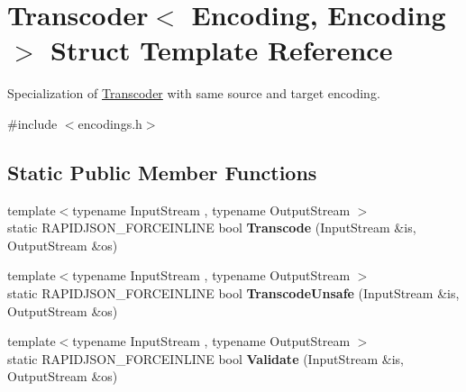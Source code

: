 \hypertarget{struct_transcoder_3_01_encoding_00_01_encoding_01_4}{}\section{Transcoder$<$ Encoding, Encoding $>$ Struct Template Reference}
\label{struct_transcoder_3_01_encoding_00_01_encoding_01_4}


Specialization of \hyperlink{struct_transcoder}{Transcoder} with same source and target encoding.  




{\ttfamily \#include $<$encodings.\+h$>$}

\subsection*{Static Public Member Functions}
\begin{DoxyCompactItemize}
\item 
\mbox{\label{struct_transcoder_3_01_encoding_00_01_encoding_01_4_aad11cdc2b829123a7b9969e34d456813}} 
{\footnotesize template$<$typename Input\+Stream , typename Output\+Stream $>$ }\\static R\+A\+P\+I\+D\+J\+S\+O\+N\+\_\+\+F\+O\+R\+C\+E\+I\+N\+L\+I\+NE bool {\bfseries Transcode} (Input\+Stream \&is, Output\+Stream \&os)
\item 
\mbox{\label{struct_transcoder_3_01_encoding_00_01_encoding_01_4_addf67decfff7d0de510c47842eb53cef}} 
{\footnotesize template$<$typename Input\+Stream , typename Output\+Stream $>$ }\\static R\+A\+P\+I\+D\+J\+S\+O\+N\+\_\+\+F\+O\+R\+C\+E\+I\+N\+L\+I\+NE bool {\bfseries Transcode\+Unsafe} (Input\+Stream \&is, Output\+Stream \&os)
\item 
\mbox{\label{struct_transcoder_3_01_encoding_00_01_encoding_01_4_a536aa3930251161d05e112947ec2f9c8}} 
{\footnotesize template$<$typename Input\+Stream , typename Output\+Stream $>$ }\\static R\+A\+P\+I\+D\+J\+S\+O\+N\+\_\+\+F\+O\+R\+C\+E\+I\+N\+L\+I\+NE bool {\bfseries Validate} (Input\+Stream \&is, Output\+Stream \&os)
\end{DoxyCompactItemize}


